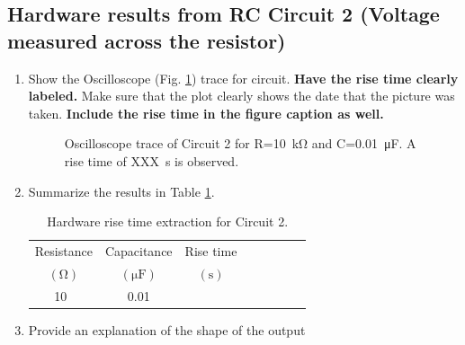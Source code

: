 \documentclass[11pt]{article}
\begin{document}
\subsection{Hardware results from RC Circuit 2 (Voltage measured across the resistor)}
\label{Section:HardwareCircuit2}
\begin{enumerate}
	\item Show the Oscilloscope (Fig. \ref{fig:Circuit2Oscope}) trace for circuit.  \textbf{Have the rise time clearly labeled.}  Make sure that the plot clearly shows the date that the picture was taken. \textbf{Include the rise time in the figure caption as well.}
		\begin{figure}[h!]
		\vspace{2in}
		\caption{Oscilloscope trace of Circuit 2 for R=10~\si{\kilo\ohm} and C=0.01~\si{\micro\farad}.  A rise time of XXX~\si{\s} is observed.}
		\label{fig:Circuit2Oscope}
	\end{figure}
	\item 	Summarize the results in Table \ref{Table:RiseTimeTableCircuit2Hardware}.
	\begin{table}[h]
		\centering
		\caption{Hardware rise time extraction for Circuit 2.}
		\label{Table:RiseTimeTableCircuit2Hardware}
		\begin{tabular}{|c |c|| c|| c | c | c| c|c |}\hline
			Resistance  & Capacitance &  Rise time    \\
			$\left(\si{\ohm}\right)$ 	  & $\left(\si{\micro\farad}\right)$	 & $\left(\si{\s}\right)$   \\	
			\hline
			10~\si{\kilo}& 0.01&  \\
			\hline
		\end{tabular}
	\end{table}
	\item Provide an explanation of the shape of the output
\end{enumerate}

\end{document}
